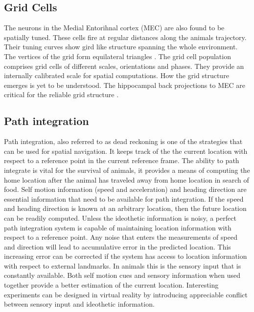 \subsection{Grid Cells}
The neurons in the Medial Entorihnal cortex (MEC) are also found to be spatially tuned. These cells fire at regular distances along the animals trajectory. Their tuning curves show gird like structure spanning the whole environment. The vertices of the grid form equilateral triangles \cite{Hafting2005}. The grid cell population comprises grid cells of different scales, orientations and phases. They provide an internally  calibrated scale for spatial computations. How the grid structure emerges is yet to be understood. The hippocampal back projections to MEC are critical for the reliable grid structure \cite{Bonnevie2013}. 

\subsection{Path integration}
\label{pathIntgr}
Path integration, also referred to as dead reckoning is one of the strategies that can be used for spatial navigation. It keeps track of the the current location with respect to a reference point in the current reference frame. The ability to path integrate is vital for the survival of animals, it provides a means of computing the home location after the animal has traveled away from home location in search of food.
Self motion information (speed and acceleration) and heading direction are essential information that need to be available for path integration. If the speed and heading direction is known at an arbitrary location, then the future location can be readily computed. Unless the ideothetic information is noisy, a perfect path integration system is capable of maintaining location information with respect to a reference point. Any noise that enters the measurements of speed and direction will lead to accumulative error in the predicted location. This increasing error can be corrected if the system has access to location information with respect to external landmarks. In animals this is the sensory input that is constantly available. Both self motion cues and sensory information when used together provide a better estimation of the current location. Interesting experiments can be designed in virtual reality by introducing appreciable conflict between sensory input and ideothetic information. 

